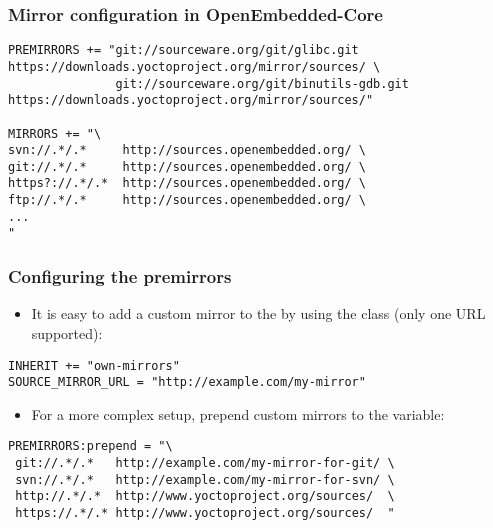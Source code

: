 \begin{frame}[fragile]
  \frametitle{Mirror configuration in OpenEmbedded-Core}
  \begin{block}{}
    \begin{verbatim}
PREMIRRORS += "git://sourceware.org/git/glibc.git        https://downloads.yoctoproject.org/mirror/sources/ \
               git://sourceware.org/git/binutils-gdb.git https://downloads.yoctoproject.org/mirror/sources/"

MIRRORS += "\
svn://.*/.*     http://sources.openembedded.org/ \
git://.*/.*     http://sources.openembedded.org/ \
https?://.*/.*  http://sources.openembedded.org/ \
ftp://.*/.*     http://sources.openembedded.org/ \
...
"
    \end{verbatim}
  \end{block}
\end{frame}

\begin{frame}[fragile]
  \frametitle{Configuring the premirrors}
  \begin{itemize}
    \item It is easy to add a custom mirror to the  by
      using the  class (only one URL supported):
  \end{itemize}
  \begin{block}{}
    \begin{verbatim}
INHERIT += "own-mirrors"
SOURCE_MIRROR_URL = "http://example.com/my-mirror"
    \end{verbatim}
  \end{block}
  \begin{itemize}
    \item For a more complex setup,  prepend custom mirrors to the
       variable:
  \end{itemize}
  \begin{block}{}
    \begin{verbatim}
PREMIRRORS:prepend = "\
 git://.*/.*   http://example.com/my-mirror-for-git/ \
 svn://.*/.*   http://example.com/my-mirror-for-svn/ \
 http://.*/.*  http://www.yoctoproject.org/sources/  \
 https://.*/.* http://www.yoctoproject.org/sources/  "
    \end{verbatim}
  \end{block}
\end{frame}


